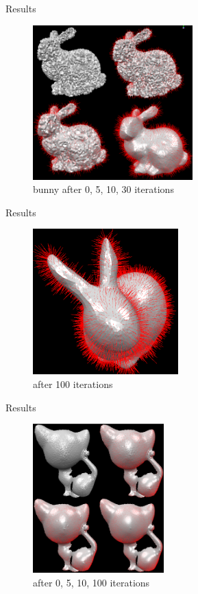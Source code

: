 \documentclass{beamer}
\begin{document}
\begin{frame}{Results}
\begin{figure}[htb]
\centering
\includegraphics[width=0.55\textwidth]{bunnies_1_10_30_raw.PNG}
\caption{bunny after 0, 5, 10, 30 iterations}
\label{fig:bunny0_1_10_30}
\end{figure}
\end{frame}

\begin{frame}{Results}
\begin{figure}[htb]
\centering
\includegraphics[width=0.5\textwidth]{bunny100.PNG}
\caption{after 100 iterations}
\label{fig:prescribed}
\end{figure}
\end{frame}

\begin{frame}{Results}
\begin{figure}[htb]
\centering
\includegraphics[width=0.45\textwidth]{kitten0_5_10_100.PNG}
\caption{after 0, 5, 10, 100 iterations}
\label{fig:prescribed}
\end{figure}
\end{frame}
\end{document}
